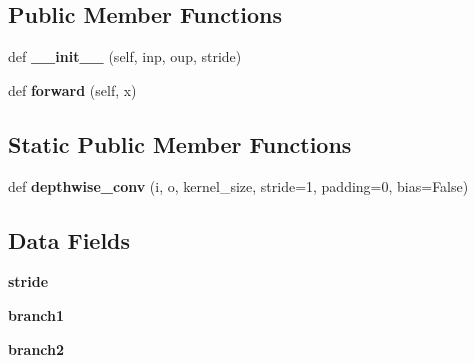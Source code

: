 \subsection*{Public Member Functions}
\begin{DoxyCompactItemize}
\item 
\mbox{\label{classtorchvision_1_1models_1_1shufflenetv2_1_1InvertedResidual_ae18c39e42da596a2b278b5af4aa2607a}} 
def {\bfseries \+\_\+\+\_\+init\+\_\+\+\_\+} (self, inp, oup, stride)
\item 
\mbox{\label{classtorchvision_1_1models_1_1shufflenetv2_1_1InvertedResidual_a73101755899060e1dfa96561f4e02455}} 
def {\bfseries forward} (self, x)
\end{DoxyCompactItemize}
\subsection*{Static Public Member Functions}
\begin{DoxyCompactItemize}
\item 
\mbox{\label{classtorchvision_1_1models_1_1shufflenetv2_1_1InvertedResidual_a648ff58f2ef05d2ac09f815908b67a1d}} 
def {\bfseries depthwise\+\_\+conv} (i, o, kernel\+\_\+size, stride=1, padding=0, bias=False)
\end{DoxyCompactItemize}
\subsection*{Data Fields}
\begin{DoxyCompactItemize}
\item 
\mbox{\label{classtorchvision_1_1models_1_1shufflenetv2_1_1InvertedResidual_ac32ce849634d5d094e1fe64b6ff0085b}} 
{\bfseries stride}
\item 
\mbox{\label{classtorchvision_1_1models_1_1shufflenetv2_1_1InvertedResidual_ac1116e3223562799c406a22fee119b6a}} 
{\bfseries branch1}
\item 
\mbox{\label{classtorchvision_1_1models_1_1shufflenetv2_1_1InvertedResidual_a173bc30965ed2160300310e37110396f}} 
{\bfseries branch2}
\end{DoxyCompactItemize}


